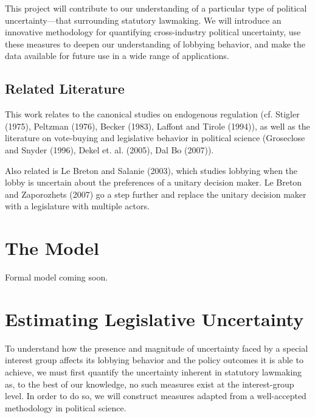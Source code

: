 \documentclass[12pt]{article}
\newcommand{\ga}{\gamma}
\begin{document}
This project will contribute to our understanding of a particular type of political uncertainty---that surrounding statutory lawmaking. We will introduce an innovative methodology for quantifying cross-industry political uncertainty, use these measures to deepen our understanding of lobbying behavior, and make the data available for future use in a wide range of applications. 

\subsection{Related Literature}
 
This work relates to the canonical studies on endogenous regulation (cf. Stigler (1975), Peltzman (1976), Becker (1983), Laffont and Tirole (1994)), as well as the literature on vote-buying and legislative behavior in political science (Groseclose and Snyder (1996), Dekel et. al. (2005), Dal Bo (2007)).	

Also related is Le Breton and Salanie (2003), which studies lobbying when the lobby is uncertain about the preferences of a unitary decision maker. Le Breton and Zaporozhets (2007) go a step further and replace the unitary decision maker with a legislature with multiple actors. 



\section{The Model}
\label{sec:model}

Formal model coming soon.


\section{Estimating Legislative Uncertainty}
\label{sec:main}

To understand how the presence and magnitude of uncertainty faced by a special interest group affects its lobbying behavior and the policy outcomes it is able to achieve, we must first quantify the uncertainty inherent in statutory lawmaking as, to the best of our knowledge, no such measures exist at the interest-group level. In order to do so, we will construct measures adapted from a well-accepted methodology in political science.
\end{document}

